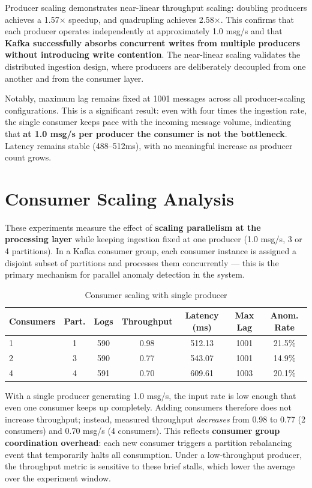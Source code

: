 \documentclass[12pt,a4paper]{report}
\begin{document}
Producer scaling demonstrates near-linear throughput scaling: doubling producers achieves
a 1.57$\times$ speedup, and quadrupling achieves 2.58$\times$. This confirms that each
producer operates independently at approximately 1.0 msg/s and that \textbf{Kafka
successfully absorbs concurrent writes from multiple producers without introducing write
contention}. The near-linear scaling validates the distributed ingestion design, where
producers are deliberately decoupled from one another and from the consumer layer.

Notably, maximum lag remains fixed at 1001 messages across all producer-scaling
configurations. This is a significant result: even with four times the ingestion rate,
the single consumer keeps pace with the incoming message volume, indicating that
\textbf{at 1.0 msg/s per producer the consumer is not the bottleneck}. Latency remains
stable (488--512ms), with no meaningful increase as producer count grows.

\section{Consumer Scaling Analysis}

These experiments measure the effect of \textbf{scaling parallelism at the processing
layer} while keeping ingestion fixed at one producer (1.0 msg/s, 3 or 4 partitions).
In a Kafka consumer group, each consumer instance is assigned a disjoint subset of
partitions and processes them concurrently --- this is the primary mechanism for parallel
anomaly detection in the system.

\begin{table}[htbp]
\centering
\small
\caption{Consumer scaling with single producer}
\label{tab:consumer-scaling}
\begin{tabular}{@{}lcccccc@{}}
\hline
\textbf{Consumers} & \textbf{Part.} & \textbf{Logs} & \textbf{Throughput} &
\textbf{Latency (ms)} & \textbf{Max Lag} & \textbf{Anom. Rate} \\
\hline
1 & 1 & 590 & 0.98 & 512.13 & 1001 & 21.5\% \\
2 & 3 & 590 & 0.77 & 543.07 & 1001 & 14.9\% \\
4 & 4 & 591 & 0.70 & 609.61 & 1003 & 20.1\% \\
\hline
\end{tabular}
\end{table}

With a single producer generating 1.0 msg/s, the input rate is low enough that even one
consumer keeps up completely. Adding consumers therefore does not increase throughput;
instead, measured throughput \textit{decreases} from 0.98 to 0.77 (2 consumers) and
0.70 msg/s (4 consumers). This reflects \textbf{consumer group coordination overhead}:
each new consumer triggers a partition rebalancing event that temporarily halts all
consumption. Under a low-throughput producer, the throughput metric is sensitive to
these brief stalls, which lower the average over the experiment window.
\end{document}
